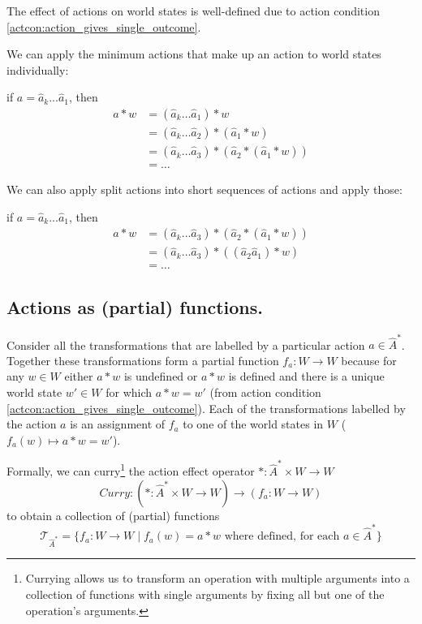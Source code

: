The effect of actions on world states is well-defined due to action condition \ref{actcon:action_gives_single_outcome}.

We can apply the minimum actions that make up an action to world states individually:

if $a = \hat{a}_{k}...\hat{a}_{1}$, then
\begin{align}
    a \ast w & = (\hat{a}_{k} \dots \hat{a}_{1}) \ast w                                       \\
             & = (\hat{a}_{k} \dots \hat{a}_{2}) \ast (\hat{a}_{1} \ast w)                    \\
             & = (\hat{a}_{k} \dots \hat{a}_{3}) \ast (\hat{a}_{2} \ast (\hat{a}_{1} \ast w)) \\
             & = \dots
\end{align}

We can also apply split actions into short sequences of actions and apply those:

if $a = \hat{a}_{k}...\hat{a}_{1}$, then
\begin{align}
    a \ast w & = (\hat{a}_{k} \dots \hat{a}_{3}) \ast (\hat{a}_{2} \ast (\hat{a}_{1} \ast w)) \\
             & = (\hat{a}_{k} \dots \hat{a}_{3}) \ast ((\hat{a}_{2} \hat{a}_{1}) \ast w)      \\
             & = \dots
\end{align}

\subsection{Actions as (partial) functions.}

Consider all the transformations that are labelled by a particular action $a \in \hat{A}^{\ast}$.
Together these transformations form a partial function $f_{a}: W \to W$ because for any $w \in W$ either $a \ast w$ is undefined or $a \ast w$ is defined and there is a unique world state $w' \in W$ for which $a \ast w = w'$ (from action condition \ref{actcon:action_gives_single_outcome}).
Each of the transformations labelled by the action $a$ is an assignment of $f_{a}$ to one of the world states in $W$ ($f_{a}(w) \mapsto a \ast w = w'$).

Formally, we can curry\footnote{Currying allows us to transform an operation with multiple arguments into a collection of functions with single arguments by fixing all but one of the operation's arguments.} the action effect operator $\ast : \hat{A}^{\ast} \times W \to W$
\begin{equation}
    \textit{Curry}: (\ast: \hat{A}^{\ast} \times W \to W) \to (f_{a}: W \to W)
\end{equation}
to obtain a collection of (partial) functions
\begin{equation}
    \mathcal{T}_{\hat{A}^{\ast}} = \{f_{a}: W \to W \mid f_{a}(w) = a \ast w \text{ where defined, for each } a \in \hat{A}^{\ast} \}
\end{equation}

